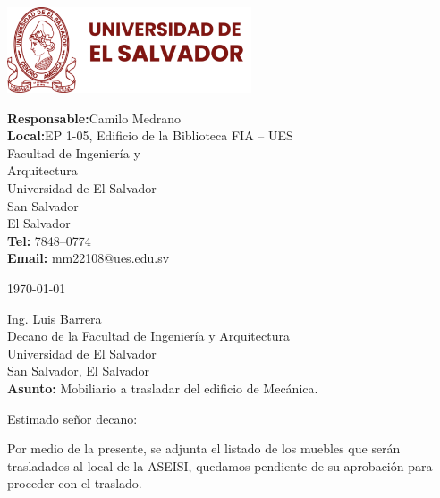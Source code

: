 \documentclass[12pt, a4paper]{letter} %
\begin{document}
\begin{minipage}{0.6\textwidth}
\includegraphics[height=1in]{Logos/ues-logo.png}
\end{minipage}
\hfill
\begin{minipage}{0.4\textwidth}\raggedright
\small{\textbf{\color{umdred}Responsable:}\hphantom{A}Camilo Medrano\\
\textbf{\color{umdred}Local:}\hphantom{A}EP 1-05, Edificio de la Biblioteca FIA -- UES\\
\hphantom{AA}Facultad de Ingeniería y\\
\hphantom{AA}Arquitectura\\
\hphantom{AA}Universidad de El Salvador\\
\hphantom{AA}San Salvador\\
\hphantom{AA}El Salvador\\
\textbf{\color{umdred}Tel: } 7848--0774\\
\textbf{\color{umdred}Email: }mm22108@ues.edu.sv }
\end{minipage}

\today

Ing. Luis Barrera\\
Decano de la Facultad de Ingeniería y Arquitectura\\
Universidad de El Salvador\\
San Salvador, El Salvador\\

\textbf{Asunto:} Mobiliario a trasladar del edificio de Mecánica.

Estimado señor decano:

Por medio de la presente, se adjunta el listado de los muebles que serán trasladados al local de la ASEISI, quedamos pendiente de su aprobación para proceder con el traslado.
\end{document}
